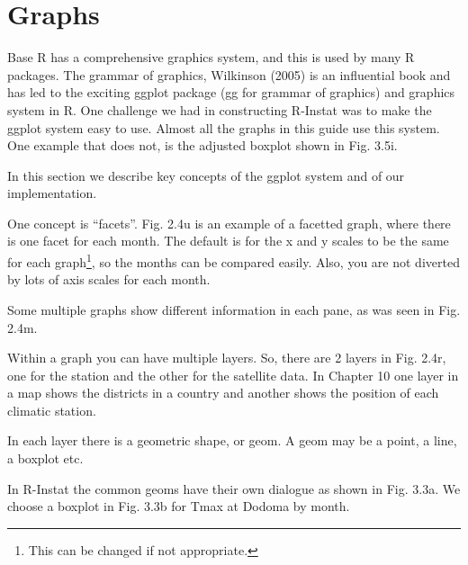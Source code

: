 \documentclass[
  letterpaper,
  DIV=11,
  numbers=noendperiod]{scrreprt}
\begin{document}
\section{Graphs}\label{graphs}

Base R has a comprehensive graphics system, and this is used by many R
packages. The grammar of graphics, Wilkinson (2005) is an influential
book and has led to the exciting ggplot package (gg for grammar of
graphics) and graphics system in R. One challenge we had in constructing
R-Instat was to make the ggplot system easy to use. Almost all the
graphs in this guide use this system. One example that does not, is the
adjusted boxplot shown in Fig. 3.5i.

In this section we describe key concepts of the ggplot system and of our
implementation.

One concept is ``facets''. Fig. 2.4u is an example of a facetted graph,
where there is one facet for each month. The default is for the x and y
scales to be the same for each graph\footnote{This can be changed if not
  appropriate.}, so the months can be compared easily. Also, you are not
diverted by lots of axis scales for each month.

Some multiple graphs show different information in each pane, as was
seen in Fig. 2.4m.

Within a graph you can have multiple layers. So, there are 2 layers in
Fig. 2.4r, one for the station and the other for the satellite data. In
Chapter 10 one layer in a map shows the districts in a country and
another shows the position of each climatic station.

In each layer there is a geometric shape, or geom. A geom may be a
point, a line, a boxplot etc.

In R-Instat the common geoms have their own dialogue as shown in Fig.
3.3a. We choose a boxplot in Fig. 3.3b for Tmax at Dodoma by month.
\end{document}
